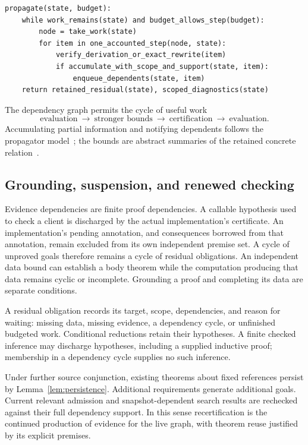 \documentclass[10pt,a4paper]{article}
\theoremstyle{remark}
\begin{document}
\begin{lstlisting}[language={}]
propagate(state, budget):
    while work_remains(state) and budget_allows_step(budget):
        node = take_work(state)
        for item in one_accounted_step(node, state):
            verify_derivation_or_exact_rewrite(item)
            if accumulate_with_scope_and_support(state, item):
                enqueue_dependents(state, item)
    return retained_residual(state), scoped_diagnostics(state)
\end{lstlisting}
The dependency graph permits the cycle of useful work
\[
 \text{evaluation}\ \longrightarrow\ \text{stronger bounds}\
 \longrightarrow\ \text{certification}\ \longrightarrow\ \text{evaluation}.
\]
Accumulating partial information and notifying dependents follows the propagator
model~\cite{propagators}; the bounds are abstract summaries of the retained
concrete relation~\cite{abstract}.

\subsection{Grounding, suspension, and renewed checking}
Evidence dependencies are finite proof dependencies. A callable hypothesis used
to check a client is discharged by the actual implementation's certificate.
An implementation's pending annotation, and consequences borrowed from that
annotation, remain excluded from its own independent premise set. A cycle of
unproved goals therefore remains a cycle of residual obligations. An independent
data bound can establish a body theorem while the computation producing that
data remains cyclic or incomplete. Grounding a proof and completing its data
are separate conditions.

A residual obligation records its target, scope, dependencies, and reason for
waiting: missing data, missing evidence, a dependency cycle, or unfinished
budgeted work. Conditional reductions retain their hypotheses. A finite checked
inference may discharge hypotheses, including a supplied inductive proof;
membership in a dependency cycle supplies no such inference.

Under further source conjunction, existing theorems about fixed references
persist by Lemma~\ref{lem:persistence}. Additional requirements generate
additional goals. Current relevant admission and snapshot-dependent search
results are rechecked against their full dependency support. In this sense
recertification is the continued production of evidence for the live graph,
with theorem reuse justified by its explicit premises.
\end{document}

